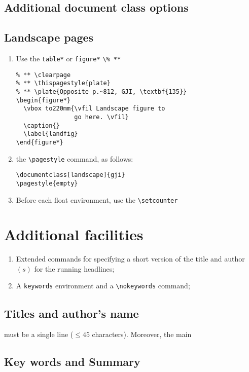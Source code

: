 \subsection{Additional document class options}\label{classoptions}


\subsection{Landscape pages}

\begin{enumerate}
  \item Use the \verb"table*" or \verb"figure*"
        \verb"\% **"
\begin{verbatim}
% ** \clearpage
% ** \thispagestyle{plate}
% ** \plate{Opposite p.~812, GJI, \textbf{135}}
\begin{figure*}
  \vbox to220mm{\vfil Landscape figure to
                go here. \vfil}
  \caption{}
  \label{landfig}
\end{figure*}
\end{verbatim}
\item the \verb"\pagestyle" command, as follows:
\begin{verbatim}
\documentclass[landscape]{gji}
\pagestyle{empty}
\end{verbatim}
  \item Before each float environment, use the \verb"\setcounter"
\end{enumerate}


\section{Additional facilities}

\begin{enumerate}
  \item Extended commands for specifying a short version of the title and
        author$(s)$ for the running headlines;
  \item A \verb"keywords" environment and a \verb"\nokeywords" command;
 \end{enumerate}

\subsection{Titles and author's name}

must be a single line ($\leqslant 45$ characters). Moreover, the main

\subsection{Key words and Summary}

